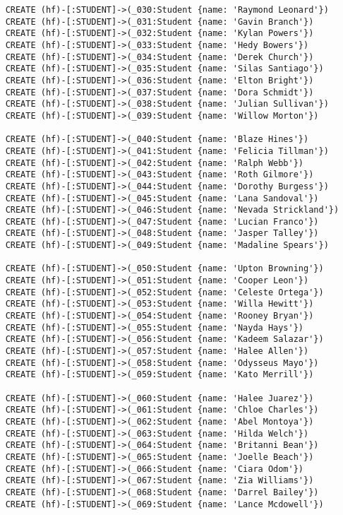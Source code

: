 \begin{lstlisting}
	CREATE (hf)-[:STUDENT]->(_030:Student {name: 'Raymond Leonard'})
	CREATE (hf)-[:STUDENT]->(_031:Student {name: 'Gavin Branch'})
	CREATE (hf)-[:STUDENT]->(_032:Student {name: 'Kylan Powers'})
	CREATE (hf)-[:STUDENT]->(_033:Student {name: 'Hedy Bowers'})
	CREATE (hf)-[:STUDENT]->(_034:Student {name: 'Derek Church'})
	CREATE (hf)-[:STUDENT]->(_035:Student {name: 'Silas Santiago'})
	CREATE (hf)-[:STUDENT]->(_036:Student {name: 'Elton Bright'})
	CREATE (hf)-[:STUDENT]->(_037:Student {name: 'Dora Schmidt'})
	CREATE (hf)-[:STUDENT]->(_038:Student {name: 'Julian Sullivan'})
	CREATE (hf)-[:STUDENT]->(_039:Student {name: 'Willow Morton'})
	
	CREATE (hf)-[:STUDENT]->(_040:Student {name: 'Blaze Hines'})
	CREATE (hf)-[:STUDENT]->(_041:Student {name: 'Felicia Tillman'})
	CREATE (hf)-[:STUDENT]->(_042:Student {name: 'Ralph Webb'})
	CREATE (hf)-[:STUDENT]->(_043:Student {name: 'Roth Gilmore'})
	CREATE (hf)-[:STUDENT]->(_044:Student {name: 'Dorothy Burgess'})
	CREATE (hf)-[:STUDENT]->(_045:Student {name: 'Lana Sandoval'})
	CREATE (hf)-[:STUDENT]->(_046:Student {name: 'Nevada Strickland'})
	CREATE (hf)-[:STUDENT]->(_047:Student {name: 'Lucian Franco'})
	CREATE (hf)-[:STUDENT]->(_048:Student {name: 'Jasper Talley'})
	CREATE (hf)-[:STUDENT]->(_049:Student {name: 'Madaline Spears'})
	
	CREATE (hf)-[:STUDENT]->(_050:Student {name: 'Upton Browning'})
	CREATE (hf)-[:STUDENT]->(_051:Student {name: 'Cooper Leon'})
	CREATE (hf)-[:STUDENT]->(_052:Student {name: 'Celeste Ortega'})
	CREATE (hf)-[:STUDENT]->(_053:Student {name: 'Willa Hewitt'})
	CREATE (hf)-[:STUDENT]->(_054:Student {name: 'Rooney Bryan'})
	CREATE (hf)-[:STUDENT]->(_055:Student {name: 'Nayda Hays'})
	CREATE (hf)-[:STUDENT]->(_056:Student {name: 'Kadeem Salazar'})
	CREATE (hf)-[:STUDENT]->(_057:Student {name: 'Halee Allen'})
	CREATE (hf)-[:STUDENT]->(_058:Student {name: 'Odysseus Mayo'})
	CREATE (hf)-[:STUDENT]->(_059:Student {name: 'Kato Merrill'})
	
	CREATE (hf)-[:STUDENT]->(_060:Student {name: 'Halee Juarez'})
	CREATE (hf)-[:STUDENT]->(_061:Student {name: 'Chloe Charles'})
	CREATE (hf)-[:STUDENT]->(_062:Student {name: 'Abel Montoya'})
	CREATE (hf)-[:STUDENT]->(_063:Student {name: 'Hilda Welch'})
	CREATE (hf)-[:STUDENT]->(_064:Student {name: 'Britanni Bean'})
	CREATE (hf)-[:STUDENT]->(_065:Student {name: 'Joelle Beach'})
	CREATE (hf)-[:STUDENT]->(_066:Student {name: 'Ciara Odom'})
	CREATE (hf)-[:STUDENT]->(_067:Student {name: 'Zia Williams'})
	CREATE (hf)-[:STUDENT]->(_068:Student {name: 'Darrel Bailey'})
	CREATE (hf)-[:STUDENT]->(_069:Student {name: 'Lance Mcdowell'})
	

\end{lstlisting}
